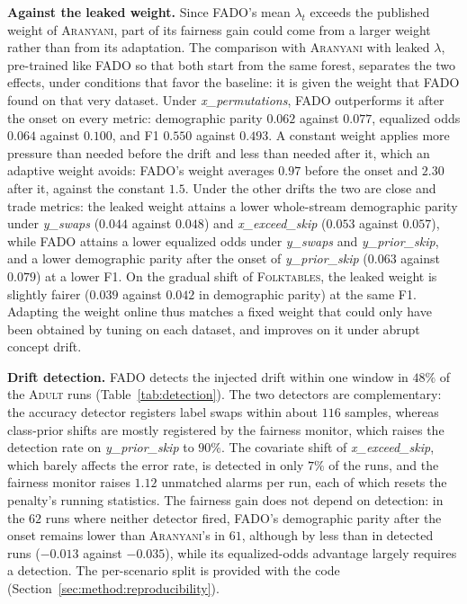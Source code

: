 \documentclass[conference]{IEEEtran}
\newcommand{\fado}{\textsc{FADO}}
\newcommand{\ara}{\textsc{Aranyani}}
\newcommand{\adult}{\textsc{Adult}}
\newcommand{\folk}{\textsc{Folktables}}
\begin{document}
\textbf{Against the leaked weight.} Since \fado{}'s mean $\lambda_t$ exceeds the published weight of \ara{}, part of its fairness gain could come from a larger
weight rather than from its adaptation. The comparison with \ara{} with leaked $\lambda$, pre-trained like \fado{} so that both start from the same forest,
separates the two effects, under conditions that favor the baseline: it is given the weight that \fado{} found on that very dataset. Under \emph{x\_permutations}, \fado{} outperforms it after the onset on every metric: demographic parity $0.062$ against
$0.077$, equalized odds $0.064$ against $0.100$, and F1 $0.550$ against $0.493$. A constant weight applies more pressure than needed before the drift and less than
needed after it, which an adaptive weight avoids: \fado{}'s weight averages $0.97$ before the onset and $2.30$ after it, against the constant $1.5$. Under the other drifts the two are close and trade metrics: the leaked weight attains a lower whole-stream
demographic parity under \emph{y\_swaps} ($0.044$ against $0.048$) and \emph{x\_exceed\_skip} ($0.053$ against $0.057$), while \fado{} attains a lower equalized odds
under \emph{y\_swaps} and \emph{y\_prior\_skip}, and a lower demographic parity after the onset of \emph{y\_prior\_skip} ($0.063$ against $0.079$) at a lower F1. On the gradual
shift of \folk{}, the leaked weight is slightly fairer ($0.039$ against $0.042$ in demographic parity) at the same F1. Adapting the weight online thus matches a fixed
weight that could only have been obtained by tuning on each dataset, and improves on it under abrupt concept drift.

\textbf{Drift detection.} \fado{} detects the injected drift within one window in $48\%$ of the \adult{} runs (Table~\ref{tab:detection}). The two detectors are
complementary: the accuracy detector registers label swaps within about $116$ samples, whereas class-prior shifts are mostly registered by the fairness monitor,
which raises the detection rate on \emph{y\_prior\_skip} to $90\%$. The covariate shift of \emph{x\_exceed\_skip}, which barely affects the error rate, is detected in only
$7\%$ of the runs, and the fairness monitor raises $1.12$ unmatched alarms per run, each of which resets the penalty's running statistics. The fairness gain does not depend on
detection: in the $62$ runs where neither detector fired, \fado{}'s demographic parity after the onset remains lower than \ara{}'s in $61$, although by less than in
detected runs ($-0.013$ against $-0.035$), while its equalized-odds advantage largely requires a detection. The per-scenario split is provided with the
code (Section~\ref{sec:method:reproducibility}).
\end{document}
